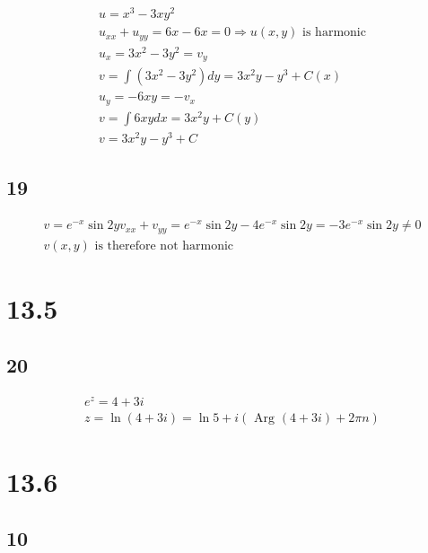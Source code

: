 \begin{gather*}
	u = x^3 - 3 x y^2
	\\
	u_{xx} + u_{yy} = 6 x - 6 x = 0 \Rightarrow u(x, y) \text{ is harmonic}
	\\
	u_x = 3 x^2 - 3 y^2 = v_y
	\\
	v = \int{\left(3 x^2 - 3 y^2\right) dy}
	=
	3 x^2 y - y^3 + C(x)
	\\
	u_y = -6 x y = -v_x
	\\
	v = \int{6 x y dx} = 3 x^2 y + C(y)
	\\
	v = 3 x^2 y - y^3 + C
\end{gather*}


\subsection*{19}


\begin{gather*}
	v = e^{-x} \sin{2 y}
	v_{xx} + v_{yy} = e^{-x} \sin{2 y} - 4 e^{-x} \sin{2 y} = -3 e^{-x} \sin{2 y} \neq 0
	\\
	v(x, y) \text{ is therefore not harmonic}
\end{gather*}


\section*{13.5}

\subsection*{20}


\begin{gather*}
	e^z = 4 + 3 i
	\\
	z = \ln{(4 + 3 i)} = \ln{5} + i (\text{ Arg } (4 + 3 i) + 2 \pi n)
\end{gather*}


\begin{center}
\end{center}


\section*{13.6}

\subsection*{10}


